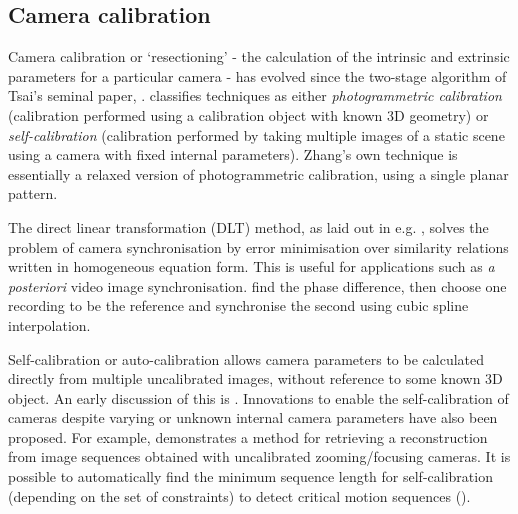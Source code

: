 \subsection{Camera calibration}

Camera calibration or `resectioning' - the calculation of the intrinsic and extrinsic parameters for a particular camera - has evolved since the two-stage algorithm of Tsai's seminal paper, \cite{TSAI}. \cite{ZHANG} classifies techniques as either \emph{photogrammetric calibration} (calibration performed using a calibration object with known 3D geometry) or \emph{self-calibration} (calibration performed by taking multiple images of a static scene using a camera with fixed internal parameters). Zhang's own technique is essentially a relaxed version of photogrammetric calibration, using a single planar pattern.

The direct linear transformation (DLT) method, as laid out in e.g. \cite{direct-linear}, solves the problem of camera synchronisation by error minimisation over similarity relations written in homogeneous equation form. This is useful for applications such as \emph{a posteriori} video image synchronisation. \cite{direct-linear} find the phase difference, then choose one recording to be the reference and synchronise the second using cubic spline interpolation.

Self-calibration or auto-calibration allows camera parameters to be calculated directly from multiple uncalibrated images, without reference to some known 3D object. An early discussion of this is \cite{self-calib}. Innovations to enable the self-calibration of cameras despite varying or unknown internal camera parameters have also been proposed. For example, \cite{self-calibration-unknown} demonstrates a method for retrieving a reconstruction from image sequences obtained with uncalibrated zooming/focusing cameras. It is possible to automatically find the minimum sequence length for self-calibration (depending on the set of constraints) to detect critical motion sequences (\cite{self-calibration-unknown}).
